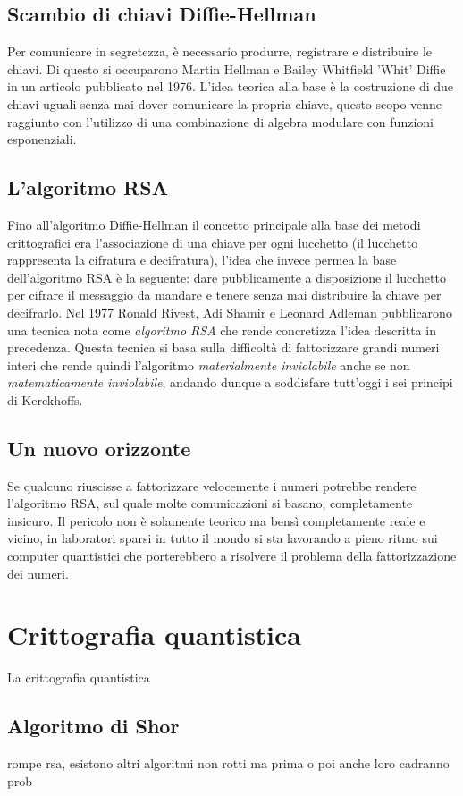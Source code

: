 \documentclass[a4paper, 12pt]{article}
\begin{document}
\subsection{Scambio di chiavi Diffie-Hellman}
Per comunicare in segretezza, è necessario produrre, registrare e distribuire le chiavi. Di questo si occuparono Martin Hellman e Bailey Whitfield 'Whit' Diffie in un articolo pubblicato nel 1976. L'idea teorica alla base è la costruzione di due chiavi uguali senza mai dover comunicare la propria chiave, questo scopo venne raggiunto con l'utilizzo di una combinazione di algebra modulare con funzioni esponenziali.
\subsection{L'algoritmo RSA}
Fino all'algoritmo Diffie-Hellman il concetto principale alla base dei metodi crittografici era l'associazione di una chiave per ogni lucchetto (il lucchetto rappresenta la cifratura e decifratura), l'idea che invece permea la base dell'algoritmo RSA è la seguente: dare pubblicamente a disposizione il lucchetto per cifrare il messaggio da mandare e tenere senza mai distribuire la chiave per decifrarlo.\newline
Nel 1977 Ronald Rivest, Adi Shamir e Leonard Adleman pubblicarono una tecnica nota come \textit{algoritmo RSA} che rende concretizza l'idea descritta in precedenza. Questa tecnica si basa sulla difficoltà di fattorizzare grandi numeri interi che rende quindi l'algoritmo \textit{materialmente inviolabile} anche se non \textit{matematicamente inviolabile}, andando dunque a soddisfare tutt'oggi i sei principi di Kerckhoffs.
\subsection{Un nuovo orizzonte}
Se qualcuno riuscisse a fattorizzare velocemente i numeri potrebbe rendere l'algoritmo RSA, sul quale molte comunicazioni si basano, completamente insicuro.
Il pericolo non è solamente teorico ma bensì completamente reale e vicino, in laboratori sparsi in tutto il mondo si sta lavorando a pieno ritmo sui computer quantistici che porterebbero a risolvere il problema della fattorizzazione dei numeri.
\section{Crittografia quantistica}
La crittografia quantistica 
\subsection{Algoritmo di Shor}
rompe rsa, esistono altri algoritmi non rotti ma prima o poi anche loro cadranno prob
\end{document}
